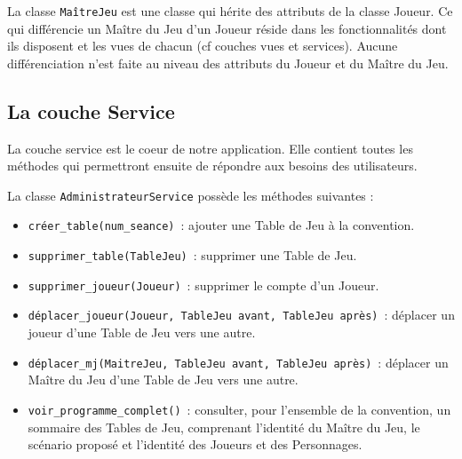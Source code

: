 \documentclass[11pt]{article}
\begin{document}
\bigbreak

La classe \texttt{MaîtreJeu} est une classe qui hérite des attributs de la classe Joueur. Ce qui différencie un Maître du Jeu d'un Joueur réside dans les fonctionnalités dont ils disposent et les vues de chacun (cf couches vues et services). Aucune différenciation n'est faite au niveau des attributs du Joueur et du Maître du Jeu.







\subsection{La couche Service}

La couche service est le coeur de notre application. Elle contient toutes les méthodes qui permettront ensuite de répondre aux besoins des utilisateurs.




\bigbreak


La classe \texttt{AdministrateurService} possède les méthodes suivantes :
\begin{itemize}[label=, font=\small]
    \item \texttt{créer\_table(num\_seance)}~: ajouter une Table de Jeu à la convention.
    \item \texttt{supprimer\_table(TableJeu)}~: supprimer une Table de Jeu.
    \item \texttt{supprimer\_joueur(Joueur)}~: supprimer le compte d'un Joueur.
    \item \texttt{déplacer\_joueur(Joueur, TableJeu avant, TableJeu après)}~: déplacer un joueur d'une Table de Jeu vers une autre.
    \item \texttt{déplacer\_mj(MaitreJeu, TableJeu avant, TableJeu après)}~: déplacer un Maître du Jeu d'une Table de Jeu vers une autre.
    \item \texttt{voir\_programme\_complet()}~: consulter, pour l'ensemble de la convention, un sommaire des Tables de Jeu, comprenant l'identité du Maître du Jeu, le scénario proposé et l'identité des Joueurs et des Personnages.
\end{itemize}

\bigbreak
\end{document}

